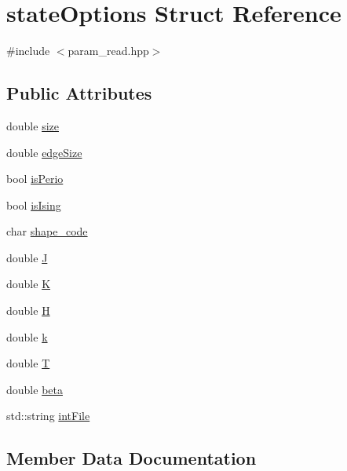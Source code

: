 \hypertarget{structstateOptions}{}\section{state\+Options Struct Reference}
\label{structstateOptions}


{\ttfamily \#include $<$param\+\_\+read.\+hpp$>$}

\subsection*{Public Attributes}
\begin{DoxyCompactItemize}
\item 
double \hyperlink{structstateOptions_a5ed5eecdf69f54a2acf888a7aab88124}{size}
\item 
double \hyperlink{structstateOptions_a7af9054b47bf7db00acf718af4e6b387}{edge\+Size}
\item 
bool \hyperlink{structstateOptions_af1f387c2337957fa425984214506e96f}{is\+Perio}
\item 
bool \hyperlink{structstateOptions_abd5ac214503b9fa16a1768a1787e9bb6}{is\+Ising}
\item 
char \hyperlink{structstateOptions_a8d4c9c4d58cda8a71a61714277de284a}{shape\+\_\+code}
\item 
double \hyperlink{structstateOptions_a0aba7b4d9b82221d5549e49674076c01}{J}
\item 
double \hyperlink{structstateOptions_a0ebc8f4a921a73401e5edd7e33123cf7}{K}
\item 
double \hyperlink{structstateOptions_a20c465233d7c8ba7460485ead694948c}{H}
\item 
double \hyperlink{structstateOptions_ae0a1de0d26e67b0ae084574317daa9bc}{k}
\item 
double \hyperlink{structstateOptions_a5a0e80c87ad28cdc24fc797d58dffbe7}{T}
\item 
double \hyperlink{structstateOptions_a82ab95a2f5f6a2d4edfa5e68b0a90a62}{beta}
\item 
std\+::string \hyperlink{structstateOptions_a930e30b2965d204c2486413c8474b157}{int\+File}
\end{DoxyCompactItemize}


\subsection{Member Data Documentation}

